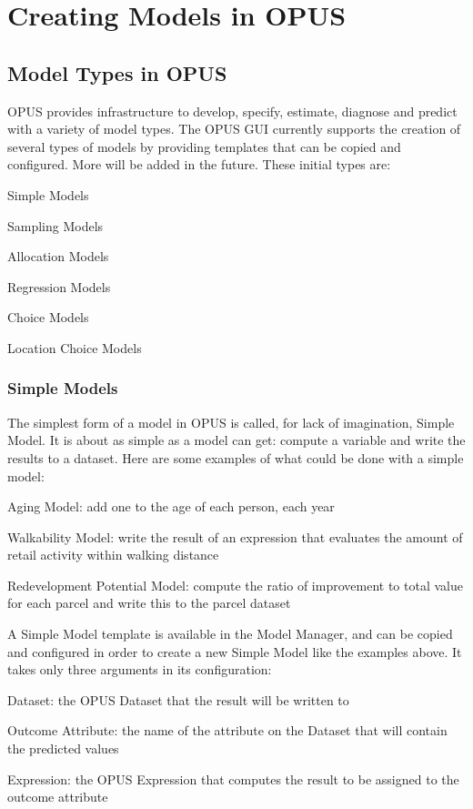 \chapter{Creating Models in OPUS}

\section{Model Types in OPUS}

OPUS provides infrastructure to develop, specify, estimate, diagnose and predict with a variety of model types.  The OPUS GUI currently supports the creation of several types of models by providing templates that can be copied and configured. More will be added in the future.  These initial types are: 

\squishlist
\item Simple Models
\item Sampling Models
\item Allocation Models
\item Regression Models
\item Choice Models
\item Location Choice Models
\squishend 

\subsection{Simple Models}
The simplest form of a model in OPUS is called, for lack of imagination, Simple Model.  It is about as simple as a model can get: compute a variable and write the results to a dataset.  Here are some examples of what could be done with a simple model:

\squishlist
\item Aging Model: add one to the age of each person, each year
\item Walkability Model: write the result of an expression that evaluates the amount of retail activity within walking distance
\item Redevelopment Potential Model: compute the ratio of improvement to total value for each parcel and write this to the parcel dataset
\squishend

A Simple Model template is available in the Model Manager, and can be copied and configured in order to create a new Simple Model like the examples above. It takes only three arguments in its configuration:

\squishlist
\item Dataset: the OPUS Dataset that the result will be written to
\item Outcome Attribute: the name of the attribute on the Dataset that will contain the predicted values
\item Expression: the OPUS Expression that computes the result to be assigned to the outcome attribute
\squishend 


